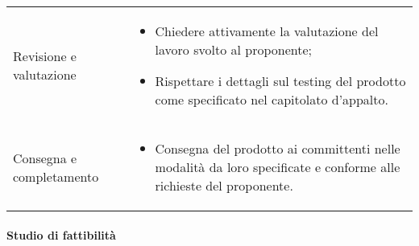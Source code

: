 {\begin{longtable}{ C{4cm} C{12cm}}
	Revisione e valutazione & \begin{itemize} \item Chiedere attivamente la valutazione del lavoro svolto al proponente; \item Rispettare i dettagli sul testing del prodotto come specificato nel capitolato d'appalto. \end{itemize}\\	
	Consegna e completamento & \begin{itemize} \item Consegna del prodotto ai committenti nelle modalità da loro specificate e conforme alle richieste del proponente. \end{itemize}\\
\end{longtable}
}
\paragraph{Studio di fattibilità} \mbox{}


